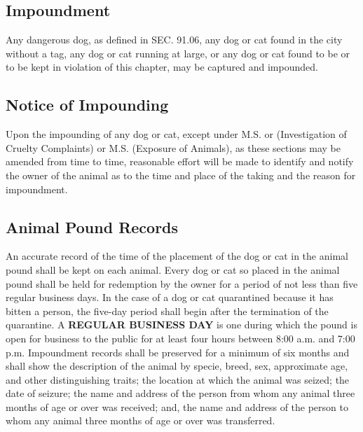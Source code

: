 \subsection{Impoundment}
Any dangerous dog, as defined in SEC. 91.06, any dog or cat found in the city without a tag, any dog or cat running at large, or any dog or cat found to be or to be kept in violation of this chapter, may be captured and impounded.
\subsection{Notice of Impounding}
Upon the impounding of any dog or cat, except under M.S.  or  (Investigation of Cruelty Complaints) or M.S.  (Exposure of Animals), as these sections may be amended from time to time, reasonable effort will be made to identify and notify the owner of the animal as to the time and place of the taking and the reason for impoundment.
\subsection{Animal Pound Records}
An accurate record of the time of the placement of the dog or cat in the animal pound shall be kept on each animal. Every dog or cat so placed in the animal pound shall be held for redemption by the owner for a period of not less than five regular business days. In the case of a dog or cat quarantined because it has bitten a person, the five-day period shall begin after the termination of the quarantine. A \textbf{REGULAR BUSINESS DAY} is one during which the pound is open for business to the public for at least four hours between 8:00 a.m. and 7:00 p.m. Impoundment records shall be preserved for a minimum of six months and shall show the description of the animal by specie, breed, sex, approximate age, and other distinguishing traits; the location at which the animal was seized; the date of seizure; the name and address of the person from whom any animal three months of age or over was received; and, the name and address of the person to whom any animal three months of age or over was transferred.
